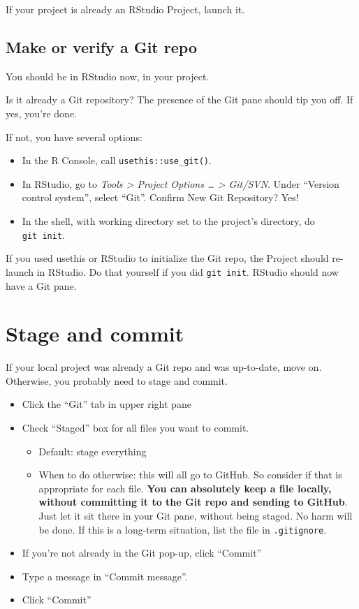 \documentclass[
]{book}
\providecommand{\tightlist}{%
  \setlength{\itemsep}{0pt}\setlength{\parskip}{0pt}}
\begin{document}
If your project is already an RStudio Project, launch it.

\subsection{Make or verify a Git repo}\label{make-or-verify-a-git-repo}

You should be in RStudio now, in your project.

Is it already a Git repository?
The presence of the Git pane should tip you off.
If yes, you're done.

If not, you have several options:

\begin{itemize}
\tightlist
\item
  In the R Console, call \texttt{usethis::use\_git()}.
\item
  In RStudio, go to \emph{Tools \textgreater{} Project Options \ldots{} \textgreater{} Git/SVN}. Under ``Version control system'', select ``Git''. Confirm New Git Repository? Yes!
\item
  In the shell, with working directory set to the project's directory, do \texttt{git\ init}.
\end{itemize}

If you used usethis or RStudio to initialize the Git repo, the Project should re-launch in RStudio.
Do that yourself if you did \texttt{git\ init}.
RStudio should now have a Git pane.

\section{Stage and commit}\label{stage-and-commit-1}

If your local project was already a Git repo and was up-to-date, move on. Otherwise, you probably need to stage and commit.

\begin{itemize}
\tightlist
\item
  Click the ``Git'' tab in upper right pane
\item
  Check ``Staged'' box for all files you want to commit.

  \begin{itemize}
  \tightlist
  \item
    Default: stage everything
  \item
    When to do otherwise: this will all go to GitHub. So consider if that is
    appropriate for each file. \textbf{You can absolutely keep a file locally,
    without committing it to the Git repo and sending to GitHub}. Just let it
    sit there in your Git pane, without being staged. No harm will be done. If
    this is a long-term situation, list the file in \texttt{.gitignore}.
  \end{itemize}
\item
  If you're not already in the Git pop-up, click ``Commit''
\item
  Type a message in ``Commit message''.
\item
  Click ``Commit''
\end{itemize}
\end{document}
